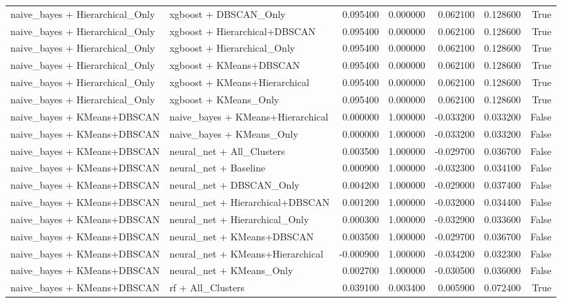 \begin{tabular}{llrrrrr}
naive_bayes + Hierarchical_Only & xgboost + DBSCAN_Only & 0.095400 & 0.000000 & 0.062100 & 0.128600 & True \\
naive_bayes + Hierarchical_Only & xgboost + Hierarchical+DBSCAN & 0.095400 & 0.000000 & 0.062100 & 0.128600 & True \\
naive_bayes + Hierarchical_Only & xgboost + Hierarchical_Only & 0.095400 & 0.000000 & 0.062100 & 0.128600 & True \\
naive_bayes + Hierarchical_Only & xgboost + KMeans+DBSCAN & 0.095400 & 0.000000 & 0.062100 & 0.128600 & True \\
naive_bayes + Hierarchical_Only & xgboost + KMeans+Hierarchical & 0.095400 & 0.000000 & 0.062100 & 0.128600 & True \\
naive_bayes + Hierarchical_Only & xgboost + KMeans_Only & 0.095400 & 0.000000 & 0.062100 & 0.128600 & True \\
naive_bayes + KMeans+DBSCAN & naive_bayes + KMeans+Hierarchical & 0.000000 & 1.000000 & -0.033200 & 0.033200 & False \\
naive_bayes + KMeans+DBSCAN & naive_bayes + KMeans_Only & 0.000000 & 1.000000 & -0.033200 & 0.033200 & False \\
naive_bayes + KMeans+DBSCAN & neural_net + All_Clusters & 0.003500 & 1.000000 & -0.029700 & 0.036700 & False \\
naive_bayes + KMeans+DBSCAN & neural_net + Baseline & 0.000900 & 1.000000 & -0.032300 & 0.034100 & False \\
naive_bayes + KMeans+DBSCAN & neural_net + DBSCAN_Only & 0.004200 & 1.000000 & -0.029000 & 0.037400 & False \\
naive_bayes + KMeans+DBSCAN & neural_net + Hierarchical+DBSCAN & 0.001200 & 1.000000 & -0.032000 & 0.034400 & False \\
naive_bayes + KMeans+DBSCAN & neural_net + Hierarchical_Only & 0.000300 & 1.000000 & -0.032900 & 0.033600 & False \\
naive_bayes + KMeans+DBSCAN & neural_net + KMeans+DBSCAN & 0.003500 & 1.000000 & -0.029700 & 0.036700 & False \\
naive_bayes + KMeans+DBSCAN & neural_net + KMeans+Hierarchical & -0.000900 & 1.000000 & -0.034200 & 0.032300 & False \\
naive_bayes + KMeans+DBSCAN & neural_net + KMeans_Only & 0.002700 & 1.000000 & -0.030500 & 0.036000 & False \\
naive_bayes + KMeans+DBSCAN & rf + All_Clusters & 0.039100 & 0.003400 & 0.005900 & 0.072400 & True \\

\end{tabular}
